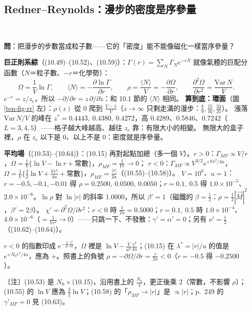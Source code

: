 \subsection{Redner--Reynolds：漫步的密度是序參量}
\leavevmode{}\ \par\nopagebreak

\textbf{問}：把漫步的步數當成粒子數——它的「密度」能不能像磁化一樣當序參量？

\textbf{巨正則系綜}（(10.49)--(10.52)、(10.59)）：$\Gamma(r)=\sum_N\Gamma_Ne^{-rN}$ 就像氣體的巨配分函數（$N$＝粒子數、$-r$＝化學勢）：
\[\Omega=\frac1V\ln\Gamma,\qquad\langle N\rangle=-\frac{\partial\ln\Gamma}{\partial r},\qquad\rho=\frac{\langle N\rangle}V=-\frac{\partial\Omega}{\partial r},\qquad\frac{\partial^2\Omega}{\partial r^2}=\frac{\mathrm{Var}\,N}V .\tag{10.49--10.59}\]
$e^{-r}=z/z_c$，所以 $-\partial/\partial r=z\,\partial/\partial z$：和 10.1 節的 $\langle N\rangle$ 相同。
\textbf{算到底：環面}（圖 \ref{ten-fig-rr} 左）：$\rho(z)$ 從 0 爬到 $\frac{V-1}V$（$z\to\infty$ 只剩走滿的漫步：$\frac89,\frac{15}{16},\frac{24}{25}$）。
漲落 $\mathrm{Var}\,N/V$ 的峰在 $z^*=0.4443,\allowbreak\ 0.4380,\allowbreak\ 0.4272$，高 0.4289、0.5846、0.7242（$L=3,4,5$）——格子越大峰越高、越往 $z_c$ 靠：有限大小的相變。
無限大的盒子裡，$\rho$ 在 $z_c$ 以下是 0、以上不是 0：密度就是序參量。

\textbf{平均場}（(10.53)--(10.64)）：(10.15) 再對起點加總（多一個 $V$）。$r>0$：$\Gamma_{MF}\propto V/r$，$\Omega=\frac1V\{\ln V-\ln r+\text{常數}\}$，$\rho_{MF}=\frac1{Vr}\to0$；
$r<0$：$\Gamma_{MF}\propto V^{3/2}e^{+Vr^2/4u}$，$\Omega=\frac1V\{\frac32\ln V+\frac{Vr^2}{4u}+\text{常數}\}$，$\rho_{MF}=\frac{|r|}{2u}$（(10.55)--(10.58)）。
$V=10^6$、$u=1$：$r=-0.5,\allowbreak-0.1,\allowbreak-0.01$ 得 $\rho=0.2500,\allowbreak\ 0.0500,\allowbreak\ 0.0050$；$r=0.1,\allowbreak\ 0.5$ 得 $1.0\times10^{-5}$、$2.0\times10^{-6}$。$\ln\rho$ 對 $\ln|r|$ 的斜率 1.0000，所以 $\beta'=1$（磁鐵的 $\beta=\frac12$：$\rho=\frac12|\vec M|^2$，$\beta'=2\beta$）。
$\chi'=\partial^2\Omega/\partial r^2$：$r<0$ 時 $\frac1{2u}=0.5000$；$r=0.1,\allowbreak\ 0.5$ 時 $1.0\times10^{-4}$、$4.0\times10^{-6}$（$=\frac1{Vr^2}\to0$）——只跳一下、不發散：$\gamma'=\alpha'=0$；另有 $\nu'=\frac12$（(10.62)--(10.64)）。
\begin{errbox}[pp.~247--248，(10.53)(10.55)]
$r<0$ 的指數印成 $e^{-\frac V{a^d}\frac{r^2}{4u}}$，$\Omega$ 裡是 $\ln V-\frac V{a^d}\frac{r^2}{4u}$；(10.15) 在 $\lambda^*=|r|/u$ 的值是 $e^{+N_0r^2/4u}$，應為 $+$。照書上的負號 $\rho=-\partial\Omega/\partial r=\frac r{2u}<0$（$r=-0.5$ 得 $-0.2500$）。
\end{errbox}
〔注〕(10.53) 是 $N_0\times$(10.15)，沿用書上的 $\frac{N_0}4$，更正後乘 2（常數，不影響 $\rho$）；(10.55) 的 $\ln V$ 應為 $\frac32\ln V$；(10.58) 的「$\rho_{MF}\to|r|$」是 $\propto|r|$；p.~249 的 $\gamma'_{MF}=0$ 見 (10.63)。

